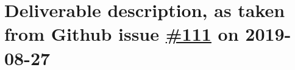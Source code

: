 \hypertarget{deliverable-description-as-taken-from-github-issue-111-on-2019-08-27}{%
\section*{\texorpdfstring{Deliverable description, as taken from Github
issue
\href{https://github.com/OpenDreamKit/OpenDreamKit/issues/111}{\#111} on
2019-08-27}{Deliverable description, as taken from Github issue \#111 on 2019-08-27}}\label{deliverable-description-as-taken-from-github-issue-111-on-2019-08-27}}

